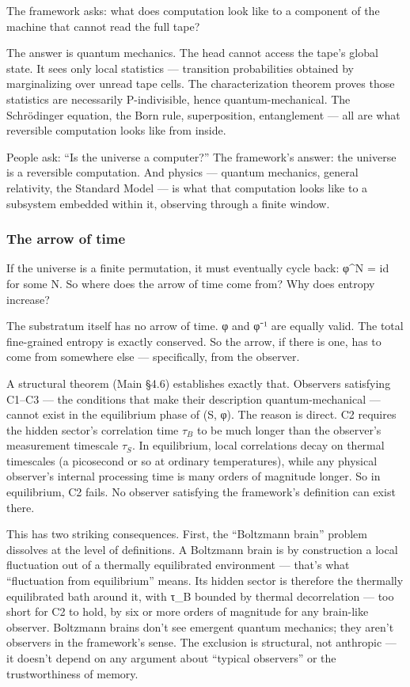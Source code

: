 \documentclass[
]{article}
\begin{document}
The framework asks: what does computation look like to a component of
the machine that cannot read the full tape?

The answer is quantum mechanics. The head cannot access the tape's
global state. It sees only local statistics --- transition probabilities
obtained by marginalizing over unread tape cells. The characterization
theorem proves those statistics are necessarily P-indivisible, hence
quantum-mechanical. The Schrödinger equation, the Born rule,
superposition, entanglement --- all are what reversible computation
looks like from inside.

People ask: ``Is the universe a computer?'' The framework's answer: the
universe is a reversible computation. And physics --- quantum mechanics,
general relativity, the Standard Model --- is what that computation
looks like to a subsystem embedded within it, observing through a finite
window.

\hypertarget{the-arrow-of-time}{%
\subsubsection{The arrow of time}\label{the-arrow-of-time}}

If the universe is a finite permutation, it must eventually cycle back:
φ\^{}N = id for some N. So where does the arrow of time come from? Why
does entropy increase?

The substratum itself has no arrow of time. φ and φ⁻¹ are equally valid.
The total fine-grained entropy is exactly conserved. So the arrow, if
there is one, has to come from somewhere else --- specifically, from the
observer.

A structural theorem (Main §4.6) establishes exactly that. Observers
satisfying C1--C3 --- the conditions that make their description
quantum-mechanical --- cannot exist in the equilibrium phase of (S, φ).
The reason is direct. C2 requires the hidden sector's correlation time
\(\tau_B\) to be much longer than the observer's measurement timescale
\(\tau_S\). In equilibrium, local correlations decay on thermal
timescales (a picosecond or so at ordinary temperatures), while any
physical observer's internal processing time is many orders of magnitude
longer. So in equilibrium, C2 fails. No observer satisfying the
framework's definition can exist there.

This has two striking consequences. First, the ``Boltzmann brain''
problem dissolves at the level of definitions. A Boltzmann brain is by
construction a local fluctuation out of a thermally equilibrated
environment --- that's what ``fluctuation from equilibrium'' means. Its
hidden sector is therefore the thermally equilibrated bath around it,
with τ\_B bounded by thermal decorrelation --- too short for C2 to hold,
by six or more orders of magnitude for any brain-like observer.
Boltzmann brains don't see emergent quantum mechanics; they aren't
observers in the framework's sense. The exclusion is structural, not
anthropic --- it doesn't depend on any argument about ``typical
observers'' or the trustworthiness of memory.
\end{document}
